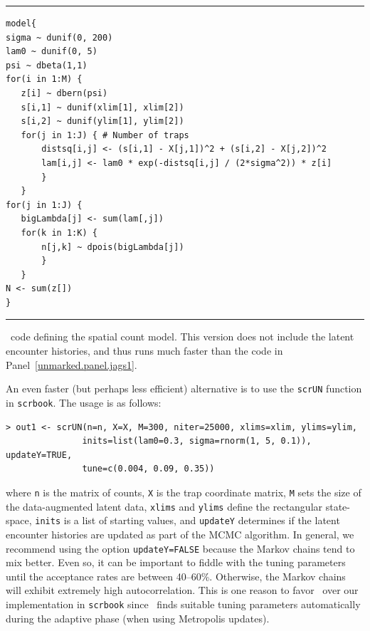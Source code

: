 \begin{panel}[ht]
\centering
\rule[0.05in]{\textwidth}{.03in}
\begin{small}
\begin{verbatim}
model{
sigma ~ dunif(0, 200)
lam0 ~ dunif(0, 5)
psi ~ dbeta(1,1)
for(i in 1:M) {
   z[i] ~ dbern(psi)
   s[i,1] ~ dunif(xlim[1], xlim[2])
   s[i,2] ~ dunif(ylim[1], ylim[2])
   for(j in 1:J) { # Number of traps
       distsq[i,j] <- (s[i,1] - X[j,1])^2 + (s[i,2] - X[j,2])^2
       lam[i,j] <- lam0 * exp(-distsq[i,j] / (2*sigma^2)) * z[i]
       }
   }
for(j in 1:J) {
   bigLambda[j] <- sum(lam[,j])
   for(k in 1:K) {
       n[j,k] ~ dpois(bigLambda[j])
       }
   }
N <- sum(z[])
}
\end{verbatim}
\end{small}
\rule[0.15in]{\textwidth}{.03in}
\caption{\jags~code defining the spatial count model. This version
  does not include the latent encounter histories, and thus runs much
  faster than the code in Panel~\ref{unmarked.panel.jags1}.}
\label{unmarked.panel.jags2}
\end{panel}



An even faster (but perhaps less efficient) alternative is to use the
\verb+scrUN+ function in \texttt{scrbook}.
The usage is as follows:
\begin{small}
\begin{verbatim}
> out1 <- scrUN(n=n, X=X, M=300, niter=25000, xlims=xlim, ylims=ylim,
               inits=list(lam0=0.3, sigma=rnorm(1, 5, 0.1)), updateY=TRUE,
               tune=c(0.004, 0.09, 0.35))
\end{verbatim}
\end{small}
where \verb+n+ is the matrix of counts, \verb+X+ is the trap
coordinate matrix, \verb+M+ sets the size of the data-augmented latent
data, \verb+xlims+ and \verb+ylims+ define the
rectangular state-space, \verb+inits+ is a list of starting values,
and \verb+updateY+ determines if the latent encounter histories are
updated as part of the MCMC algorithm. In general, we recommend using the option
\verb+updateY=FALSE+ because the Markov chains tend to mix
better. %
Even so, it can be important to fiddle with the tuning parameters until the
acceptance rates are between 40--60\%. Otherwise, the Markov chains
will exhibit extremely high autocorrelation. This is one reason to favor
\jags~over our implementation in \texttt{scrbook} since \jags~finds
suitable tuning parameters automatically during the adaptive phase
(when using Metropolis updates).

